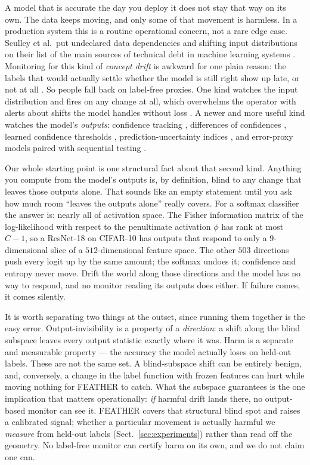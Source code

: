\documentclass[graybox]{SNmult}
\newcommand{\act}{\phi}
\begin{document}
A model that is accurate the day you deploy it does not stay that way on its
own. The data keeps moving, and only some of that movement is harmless. In a
production system this is a routine operational concern, not a rare edge
case. Sculley et al.\ put undeclared data dependencies and shifting input
distributions on their list of the main sources of technical debt in machine
learning systems \cite{sculley2015debt}. Monitoring for this kind of
\emph{concept drift} is awkward for one plain reason: the labels that would
actually settle whether the model is still right show up late, or not at all
\cite{gama2014survey, lu2018learning}. So people fall back on label-free
proxies. One kind watches the input distribution and fires on any change at
all, which overwhelms the operator with alerts about shifts the model handles
without loss \cite{rabanser2019failing}. A newer and more useful kind
watches the model's \emph{outputs}: confidence tracking
\cite{hendrycks2017baseline}, differences of confidences
\cite{guillory2021doc}, learned confidence thresholds \cite{garg2022atc},
prediction-uncertainty indices \cite{pudd2025}, and error-proxy models paired
with sequential testing \cite{amoukou2024sequential}.

Our whole starting point is one structural fact about that second kind.
Anything you compute from the model's outputs is, by definition, blind to any
change that leaves those outputs alone. That sounds like an empty statement
until you ask how much room ``leaves the outputs alone'' really covers. For a
softmax classifier the answer is: nearly all of activation space. The Fisher
information matrix of the log-likelihood with respect to the penultimate
activation $\act$ has rank at most $C-1$, so a ResNet-18 on CIFAR-10 has
outputs that respond to only a $9$-dimensional slice of a $512$-dimensional
feature space. The other $503$ directions push every logit up by the same
amount; the softmax undoes it; confidence and entropy never move. Drift the
world along those directions and the model has no way to respond, and no
monitor reading its outputs does either. If failure comes, it comes silently.

It is worth separating two things at the outset, since running them together is
the easy error. Output-invisibility is a property of a \emph{direction}: a shift
along the blind subspace leaves every output statistic exactly where it was.
Harm is a separate and measurable property --- the accuracy the model actually
loses on held-out labels. These are not the same set. A blind-subspace shift can
be entirely benign, and, conversely, a change in the label function with frozen
features can hurt while moving nothing for FEATHER to catch. What the subspace
guarantees is the one implication that matters operationally: \emph{if} harmful
drift lands there, no output-based monitor can see it. FEATHER covers that
structural blind spot and raises a calibrated signal; whether a particular
movement is actually harmful we \emph{measure} from held-out labels
(Sect.~\ref{sec:experiments}) rather than read off the geometry. No label-free
monitor can certify harm on its own, and we do not claim one can.
\end{document}
